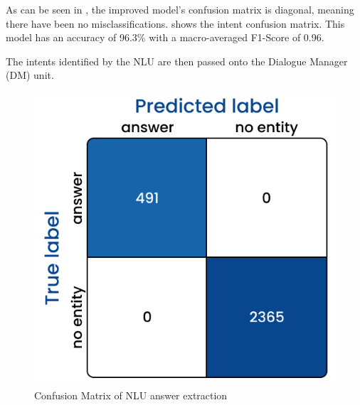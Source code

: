 \documentclass[hidelinks, 11pt]{article}
\begin{document}
As can be seen in , the improved model's confusion matrix is diagonal, meaning there have been no misclassifications.  shows the intent confusion matrix. This model has an accuracy of 96.3\% with a macro-averaged F1-Score of 0.96.

The intents identified by the NLU are then passed onto the Dialogue Manager (DM) unit.

\begin{figure}[h!]
  \includegraphics[width=\columnwidth]{images/answer_confusion_matrix.jpg}
  \caption{Confusion Matrix of NLU answer extraction}
  \label{fig:cm_answer_extraction}
\end{figure}
\end{document}
